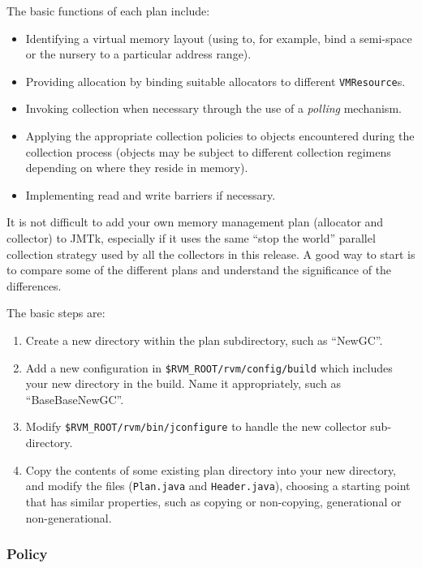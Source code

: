 The basic functions of each plan include:
\begin{itemize}
\item Identifying a virtual memory layout (using
   to, for example, bind
  a semi-space or the nursery to a particular address range).
\item Providing allocation by binding suitable allocators to different
  \texttt{VMResource}s.
\item Invoking collection when necessary through the use of a
  \emph{polling} mechanism.
\item Applying the appropriate collection policies to objects
  encountered during the collection process (objects may be subject to
  different collection regimens depending on where they reside in
  memory).
\item Implementing read and write barriers if necessary.
\end{itemize}

It is not difficult to add your own memory management plan (allocator
and collector) to JMTk, especially if it uses the same ``stop the
world'' parallel collection strategy used by all the collectors in
this release.  A good way to start is to compare some of the different
plans and understand the significance of the differences.

The basic steps are:

\begin{enumerate}
\item Create a new directory within the plan subdirectory, such as
  ``NewGC''.
\item Add a new configuration in \texttt{\$RVM\_ROOT/rvm/config/build}
  which includes your new directory in the build.  Name it
  appropriately, such as ``BaseBaseNewGC''.
\item Modify \texttt{\$RVM\_ROOT/rvm/bin/jconfigure} to handle the new
  collector sub-directory.
\item Copy the contents of some existing plan directory into your new
  directory, and modify the files (\texttt{Plan.java} and
  \texttt{Header.java}), choosing a starting point that has similar
  properties, such as copying or non-copying, generational or
  non-generational.
\end{enumerate}

\subsubsection{Policy} \label{sssec:policy}

